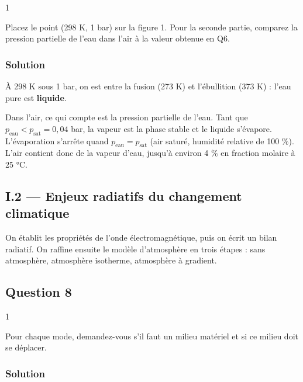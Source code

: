 \documentclass[11pt,a4paper]{article}
\begin{document}
\begin{indication}{1}

Placez le point (298 K, 1 bar) sur la figure 1. Pour la seconde partie, comparez la pression partielle de l'eau dans l'air à la valeur obtenue en Q6.

\end{indication}

\hypertarget{solution-6}{%
\subsubsection{Solution}\label{solution-6}}

À 298 K sous 1 bar, on est entre la fusion (273 K) et l'ébullition (373 K) : l'eau pure est \textbf{liquide}.

Dans l'air, ce qui compte est la pression partielle de l'eau. Tant que \(p_{\text{eau}}<p_{\text{sat}}=0{,}04\) bar, la vapeur est la phase stable et le liquide s'évapore. L'évaporation s'arrête quand \(p_{\text{eau}}=p_{\text{sat}}\) (air saturé, humidité relative de 100 \%). L'air contient donc de la vapeur d'eau, jusqu'à environ 4 \% en fraction molaire à 25 °C.

\hypertarget{i.2-enjeux-radiatifs-du-changement-climatique}{%
\subsection{I.2 --- Enjeux radiatifs du changement climatique}\label{i.2-enjeux-radiatifs-du-changement-climatique}}

On établit les propriétés de l'onde électromagnétique, puis on écrit un bilan radiatif. On raffine ensuite le modèle d'atmosphère en trois étapes : sans atmosphère, atmosphère isotherme, atmosphère à gradient.

\hypertarget{question-8}{%
\subsection{Question 8}\label{question-8}}

\begin{indication}{1}

Pour chaque mode, demandez-vous s'il faut un milieu matériel et si ce milieu doit se déplacer.

\end{indication}

\hypertarget{solution-7}{%
\subsubsection{Solution}\label{solution-7}}
\end{document}
